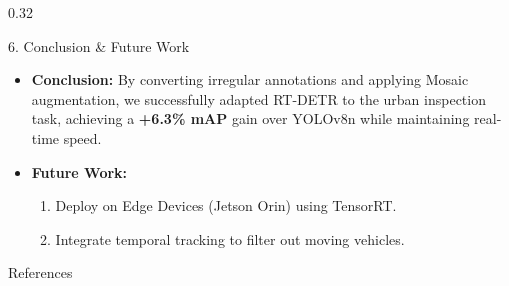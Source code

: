 \documentclass[final]{beamer}
\begin{document}
\begin{frame}{}
\begin{columns}[t]
\begin{column}{0.32\paperwidth}
  \vspace{1cm}

  \begin{block}{6. Conclusion \& Future Work}
    \begin{itemize}
        \item \textbf{Conclusion:} By converting irregular annotations and applying Mosaic augmentation, we successfully adapted RT-DETR to the urban inspection task, achieving a \textbf{+6.3\% mAP} gain over YOLOv8n while maintaining real-time speed.
        \item \textbf{Future Work:}
        \begin{enumerate}
            \item Deploy on Edge Devices (Jetson Orin) using TensorRT.
            \item Integrate temporal tracking to filter out moving vehicles.
        \end{enumerate}
    \end{itemize}
  \end{block}

  \vspace{1cm}

  \begin{block}{References}
    \scriptsize
    \printbibliography
  \end{block}

\end{column}

\end{columns}
\end{frame}
\end{document}
